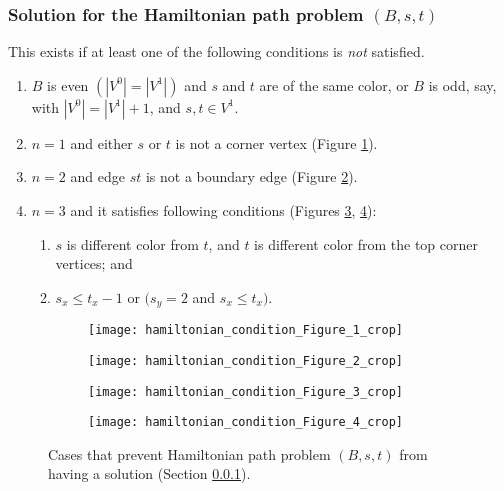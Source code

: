 \subsubsection{Solution for the Hamiltonian path problem $(B, s, t)$} \label{list:hamipathexist}
This exists if at least one of the following conditions is {\it not} satisfied. 
\begin{enumerate}
  \item $B$ is even $(|V^0| = |V^1|)$ and $s$ and $t$ are of the same color, or $B$ is odd, say, with $|V^0| = |V^1| + 1$, and $s, t \in V^1$. 
  \item $n = 1$ and either $s$ or $t$ is not a corner vertex (Figure \ref{fig:hamiltonianconda}).
  \item $n = 2$ and edge $st$ is not a boundary edge (Figure \ref{fig:hamiltoniancondb}). 
  \item $n = 3$ and it satisfies following conditions (Figures \ref{fig:hamiltoniancondc}, \ref{fig:hamiltoniancondd}):
    \begin{enumerate}
      \item $s$ is different color from $t$, and $t$ is different color from the top corner vertices; and 
      \item $s_x \leq t_x - 1$ or $(s_y = 2$ and $s_x \leq t_x)$. 
    \end{enumerate}
\end{enumerate}

\begin{figure}[htp!] 
  \centering
  \begin{subfigure}[t]{1in}
    \centering
    \texttt{[image: hamiltonian\_condition\_Figure\_1\_crop]}
    \caption{\label{fig:hamiltonianconda}}
  \end{subfigure}
  \begin{subfigure}[t]{1in}
    \centering
    \texttt{[image: hamiltonian\_condition\_Figure\_2\_crop]}
    \caption{\label{fig:hamiltoniancondb}}
  \end{subfigure}	
  \begin{subfigure}[t]{1.7in}
    \centering
    \texttt{[image: hamiltonian\_condition\_Figure\_3\_crop]}
    \caption{\label{fig:hamiltoniancondc}}
  \end{subfigure}
  \begin{subfigure}[t]{1.7in}
    \centering
    \texttt{[image: hamiltonian\_condition\_Figure\_4\_crop]}
    \caption{\label{fig:hamiltoniancondd}}
  \end{subfigure}
  \caption{\label{fig:hamiltoniancond}
    Cases that prevent Hamiltonian path problem $(B,s,t)$ from having a solution (Section \ref{list:hamipathexist}).
  }
\end{figure}

